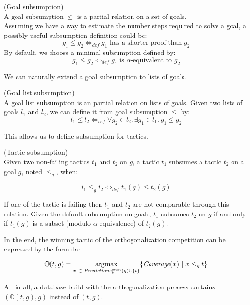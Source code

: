 \documentclass[runningheads,a4paper,draft]{svjour3}
\DeclareMathOperator*{\argmax}{\arg\!\max}
\begin{document}
\begin{definition} (Goal subsumption)\\
A goal subsumption $\le$ is a partial relation on a set of goals.\\
Assuming we have a way to estimate the number steps required to solve a goal,  
a possibly useful subsumption definition could be:
\[g_1 \le g_2  \Leftrightarrow_{def} g_1 \mbox{ has a shorter proof than } 
g_2\]
By default, we choose a minimal subsumption defined by:
\[g_1 \le g_2  \Leftrightarrow_{def} g_1 \mbox{ is }\alpha\mbox{-equivalent
to } g_2\]
\end{definition}

We can naturally extend a goal subsumption to lists of goals.
\begin{definition} (Goal list subsumption)\\
A goal list subsumption is an partial relation on lists of goals.
Given two lists of goals $l_1$ and $l_2$, we can define it from goal
subsumption $\le$ by:
\[l_1 \le l_2  \Leftrightarrow_{def} \forall g_2 \in l_2.\ \exists g_1 \in l_1.\
g_1 \le g_2\]  
\end{definition}

This allows us to define subsumption for tactics.
\begin{definition}\label{def:tacsub}(Tactic subsumption)\\
Given two non-failing tactics $t_1$ and $t_2$ on $g$, a tactic $t_1$ subsumes a
tactic $t_2$ on a goal $g$, noted $\le_g$, when:

 \[t_1 \le_g t_2 \Leftrightarrow_{def} t_1(g) \le t_2(g)\]

If one of the tactic is failing then $t_1$ and $t_2$ are not comparable through
this relation.
Given the default subsumption on goals, $t_1$ subsumes $t_2$ on $g$ if and only
if $t_1(g)$ is a subset (modulo $\alpha$-equivalence) of $t_2(g)$.
\end{definition}

In the end, the winning tactic of the orthogonalization competition can be
expressed by the formula:

\[\mathbb{O}(t,g) = \argmax_{x\ \in\ 
\mathit{Predictions}^{\mathit{tactic}}_k(g) \cup 
\lbrace t 
\rbrace} \lbrace
\textit{\mbox{Coverage}}(x)\
|\ x \le_g t\rbrace\]

All in all, a database build with the orthogonalization process contains 
$(\mathbb{O}(t,g),g)$ instead of $(t,g)$.
\end{document}
